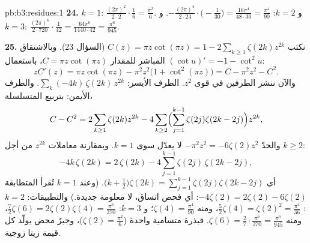 \begin{solution}{pb:b3:residues:1}
\textbf{24.} $k = 1$: $\frac{(2\pi)^2}{2\cdot2}\cdot\frac16
= \frac{\pi^2}6$. و $k = 2$: $-\frac{(2\pi)^4}{2\cdot24}
\cdot\bigl(-\frac1{30}\bigr) = \frac{16\pi^4}{48\cdot30} =
\frac{\pi^4}{90}$. و $k = 3$:
$\frac{(2\pi)^6}{2\cdot720}
\cdot\frac1{42} = \frac{64\pi^6}{1440\cdot42} =
\frac{\pi^6}{945}$.

\textbf{25.} نكتب $C(z) = \pi z\cot(\pi z) = 1 -
2\sum_{k\geq1}\zeta(2k)z^{2k}$ (السؤال 23). وبالاشتقاق المباشر
للمقدار $C = \pi z\cot(\pi z)$، باستعمال $(\cot u)'
= -1 - \cot^2u$:
\[
zC'(z) = \pi z\cot(\pi z) - \pi^2z^2\bigl(1 +
\cot^2(\pi z)\bigr) = C - \pi^2z^2 - C^2 .
\]
والآن ننشر الطرفين في قوى $z^2$. الطرف الأيسر: $\sum_k(-4k)\,\zeta(2k)\,z^{2k}$. والطرف
الأيمن: بتربيع المتسلسلة،
\[
C - C^2 = 2\sum_{k\geq1}\zeta(2k)z^{2k}
- 4\sum_{k\geq2}\Bigl(\sum_{j=1}^{k-1}\zeta(2j)
\zeta(2k-2j)\Bigr)z^{2k},
\]
والحدّ $-\pi^2z^2 = -6\zeta(2)z^2$ لا يعدّل سوى $k =
1$. وبمقارنة معاملات $z^{2k}$
من أجل $k \geq 2$:
\[
-4k\,\zeta(2k) = 2\,\zeta(2k) -
4\sum_{j=1}^{k-1}\zeta(2j)\,\zeta(2k-2j),
\]
أي $\bigl(k + \frac12\bigr)\zeta(2k) =
\sum_{j=1}^{k-1}\zeta(2j)\zeta(2k-2j)$. (وعند $k = 1$ تُقرأ المتطابقة $-4\zeta(2) = 2\zeta(2) - 6\zeta(2)$: أي فحص
اتساق، لا معلومة جديدة.) والتطبيقات: $k =
2$: $\frac52\zeta(4) = \zeta(2)^2 = \frac{\pi^4}{36}$، ومنه
$\zeta(4) = \frac{\pi^4}{90}$؛ و $k = 3$: $\frac72\zeta(6) =
2\zeta(2)\zeta(4) = \frac{\pi^6}{270}$، ومنه $\zeta(6) =
\frac{2}{7}\cdot\frac{\pi^6}{270} = \frac{\pi^6}{945}$. فبذرة متسامية واحدة
($\zeta(2) = \frac{\pi^2}6$)، وجبرٌ محض يولّد كل قيمة زيتا زوجية.
\end{solution}

